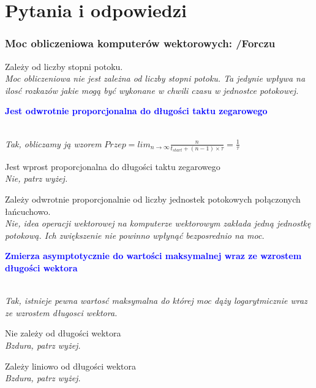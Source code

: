 \part{Pytania i odpowiedzi}
\section{Moc obliczeniowa komputerów wektorowych: {\small /Forczu}}
	\begin{itemize}
    \item Zależy od liczby stopni potoku.\\
    {\small \emph{Moc obliczeniowa nie jest zależna od liczby stopni potoku. Ta jedynie wpływa na ilosć rozkazów jakie mogą być wykonane w chwili czasu w jednostce potokowej.}}
    \textcolor{Blue}{\item \textbf{Jest odwrotnie proporcjonalna do długości taktu zegarowego}}\\
    {\small \emph{Tak, obliczamy ją wzorem} $Przep=lim_{n \to \infty}\frac{n}{t_{start}+(n-1)\times\tau}=\frac{1}{\tau}$}
    \item Jest wprost proporcjonalna do długości taktu zegarowego\\
    {\small \emph{Nie, patrz wyżej.}}
    \item Zależy odwrotnie proporcjonalnie od liczby jednostek potokowych połączonych łańcuchowo.\\
    {\small \emph{Nie, idea operacji wektorowej na komputerze wektorowym zakłada jedną jednostkę potokową. Ich zwiększenie nie powinno wpłynąć bezposrednio na moc.}}
    \textcolor{Blue}{\item \textbf{Zmierza asymptotycznie do wartości maksymalnej wraz ze wzrostem długości wektora}}\\
    {\small \emph{Tak, istnieje pewna wartosć maksymalna do której moc dąży logarytmicznie wraz ze wzrostem długosci wektora.}}
    \item Nie zależy od długości wektora\\
    {\small \emph{Bzdura, patrz wyżej.}}
    \item Zależy liniowo od długości wektora\\
    {\small \emph{Bzdura, patrz wyżej.}}
    \end{itemize}

